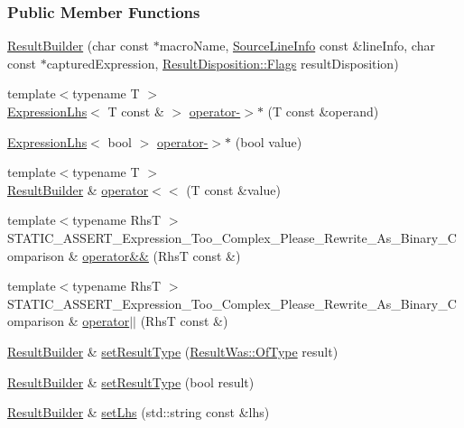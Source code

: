 \subsubsection*{Public Member Functions}
\begin{DoxyCompactItemize}
\item 
\hyperlink{a00067_a18c2929702bdde1f835e39717a0e554b}{Result\+Builder} (char const $\ast$macro\+Name, \hyperlink{a00075}{Source\+Line\+Info} const \&line\+Info, char const $\ast$captured\+Expression, \hyperlink{a00068_a3396cad6e2259af326b3aae93e23e9d8}{Result\+Disposition\+::\+Flags} result\+Disposition)
\item 
{\footnotesize template$<$typename T $>$ }\\\hyperlink{a00028}{Expression\+Lhs}$<$ T const \& $>$ \hyperlink{a00067_ae0ab04cb09f26ffdc5c7dd9eec89e7c9}{operator-\/$>$$\ast$} (T const \&operand)
\item 
\hyperlink{a00028}{Expression\+Lhs}$<$ bool $>$ \hyperlink{a00067_af2b2645b38c8dca2de0b83650383c6bd}{operator-\/$>$$\ast$} (bool value)
\item 
{\footnotesize template$<$typename T $>$ }\\\hyperlink{a00067}{Result\+Builder} \& \hyperlink{a00067_a5aa79ce6160ab8cd800eb65bbd7a28a4}{operator$<$$<$} (T const \&value)
\item 
{\footnotesize template$<$typename Rhs\+T $>$ }\\S\+T\+A\+T\+I\+C\+\_\+\+A\+S\+S\+E\+R\+T\+\_\+\+Expression\+\_\+\+Too\+\_\+\+Complex\+\_\+\+Please\+\_\+\+Rewrite\+\_\+\+As\+\_\+\+Binary\+\_\+\+Comparison \& \hyperlink{a00067_a2bbd6b026765202aee224a14d24c68bc}{operator\&\&} (Rhs\+T const \&)
\item 
{\footnotesize template$<$typename Rhs\+T $>$ }\\S\+T\+A\+T\+I\+C\+\_\+\+A\+S\+S\+E\+R\+T\+\_\+\+Expression\+\_\+\+Too\+\_\+\+Complex\+\_\+\+Please\+\_\+\+Rewrite\+\_\+\+As\+\_\+\+Binary\+\_\+\+Comparison \& \hyperlink{a00067_ad489243e89e9f0ec3cb1f95392a537de}{operator$\vert$$\vert$} (Rhs\+T const \&)
\item 
\hyperlink{a00067}{Result\+Builder} \& \hyperlink{a00067_af896e372db9d7fc90ddeceff3ad110d0}{set\+Result\+Type} (\hyperlink{a00069_a624e1ee3661fcf6094ceef1f654601ef}{Result\+Was\+::\+Of\+Type} result)
\item 
\hyperlink{a00067}{Result\+Builder} \& \hyperlink{a00067_ae504348b073d0360bfd5fc33347ec689}{set\+Result\+Type} (bool result)
\item 
\hyperlink{a00067}{Result\+Builder} \& \hyperlink{a00067_a5de584deec90fc6b7cc5bcf9eb636442}{set\+Lhs} (std\+::string const \&lhs)

\end{DoxyCompactItemize}
